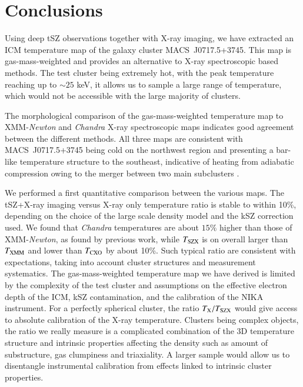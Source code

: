 \documentclass[twocolumn,traditabstract]{aa}
\newcommand{\ccor}[1]{\textcolor{Mypink}{#1}}
\def\TSZ {T_{\rm SZX}}
\def \TXC {T_{\rm CXO}}
\def \TXX {T_{\rm XMM}}
\begin{document}
\section{Conclusions}\label{sec:conclusions}
Using deep tSZ observations together with X-ray imaging, we have extracted an ICM temperature map of the galaxy cluster \mbox{MACS~J0717.5+3745}. This map is gas-mass-weighted and provides an alternative to X-ray spectroscopic based methods. The test cluster being extremely hot, with the peak temperature reaching up to $\sim 25$ keV, it allows us to sample a large range of temperature, which would not be accessible with the large majority of clusters.

The morphological comparison of the gas-mass-weighted temperature map to XMM-\textit{Newton} and \textit{Chandra} X-ray spectroscopic maps indicates good agreement between the different methods. All three maps are consistent with \mbox{MACS~J0717.5+3745} being cold on the northwest region and presenting a bar-like temperature structure to the southeast, indicative of heating from adiabatic compression owing to the merger between two main subclusters \citep[see, e.g.,][]{Ma2009}.

\ccor{We performed a first quantitative comparison between the various maps. The tSZ+X-ray imaging versus X-ray only temperature ratio is stable to within 10\%, depending on the choice of the large scale density model and the kSZ correction used. We found that \textit{Chandra} temperatures are about $15\%$ higher than those of XMM-\textit{Newton}, as found by previous work, while $\TSZ$ is on overall larger than $\TXX$ and lower than $\TXC$ by about 10\%. Such typical ratio are consistent with expectations, taking into account cluster structures and measurement systematics.} The gas-mass-weighted temperature map we have derived is limited by the complexity of the test cluster and assumptions on the effective electron depth of the ICM, kSZ contamination, and the calibration of the NIKA instrument. For a perfectly spherical cluster, the ratio $T_{\rm X} / \TSZ$ would give access to absolute calibration of the X-ray temperature. Clusters being complex objects, the ratio we really measure is a complicated combination of the 3D temperature structure and intrinsic properties affecting the density such as amount of substructure, gas clumpiness and triaxiality. A larger sample would allow us to disentangle instrumental calibration from effects linked to intrinsic cluster properties.
\end{document}
